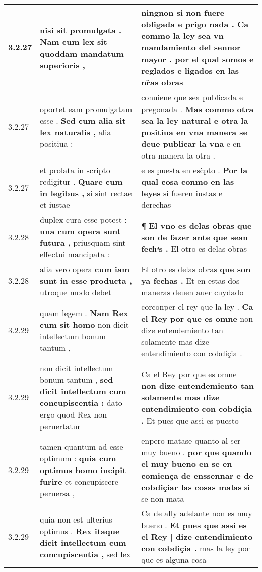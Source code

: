\begin{tabular}{|p{1cm}|p{6.5cm}|p{6.5cm}|}
3.2.27 & nisi sit promulgata . \textbf{ Nam cum lex sit } quoddam mandatum superioris , & ningnon si non fuere obligada e prigo nada . \textbf{ Ca commo la ley sea vn mandamiento del sennor mayor . } por el qual somos e reglados e ligados en las nr̃as obras \\\hline
3.2.27 & oportet eam promulgatam esse . \textbf{ Sed cum alia sit lex naturalis , } alia positiua : & conuiene que sea publicada e pregonada . \textbf{ Mas commo otra sea la ley natural e otra la positiua en vna manera se deue publicar la vna } e en otra manera la otra . \\\hline
3.2.27 & et prolata in scripto redigitur . \textbf{ Quare cum in legibus , } si sint rectae et iustae & e es puesta en esc̀pto . \textbf{ Por la qual cosa conmo en las leyes } si fueren iustas e derechas \\\hline
3.2.28 & duplex cura esse potest : \textbf{ una cum opera sunt futura , } priusquam sint effectui mancipata : & ¶ \textbf{ El vno es delas obras que son de fazer ante que sean fechͣs . } El otro es delas obras \\\hline
3.2.28 & alia vero opera \textbf{ cum iam sunt in esse producta , } utroque modo debet & El otro es delas obras \textbf{ que son ya fechas . } Et en estas dos maneras deuen auer cuydado \\\hline
3.2.29 & quam legem . \textbf{ Nam Rex cum sit homo } non dicit intellectum bonum tantum , & corconper el rey que la ley . \textbf{ Ca el Rey por que es omne } non dize entendemiento tan solamente mas dize entendimiento con cobdiçia . \\\hline
3.2.29 & non dicit intellectum bonum tantum , \textbf{ sed dicit intellectum cum concupiscentia : } dato ergo quod Rex non peruertatur & Ca el Rey por que es omne \textbf{ non dize entendemiento tan solamente mas dize entendimiento con cobdiçia . } Et pues que assi es puesto \\\hline
3.2.29 & tamen quantum ad esse optimum : \textbf{ quia cum optimus homo incipit furire } et concupiscere peruersa , & enpero matase quanto al ser muy bueno . \textbf{ por que quando el muy bueno en se en comiença de enssennar e de cobdiçiar las cosas malas } si se non mata \\\hline
3.2.29 & quia non est ulterius optimus . \textbf{ Rex itaque dicit intellectum cum concupiscentia , } sed lex & Ca de ally adelante non es muy bueno . \textbf{ Et pues que assi es el Rey | dize entendimiento con cobdiçia . } mas la ley por que es alguna cosa \\\hline

\end{tabular}
